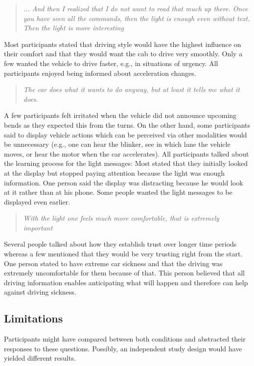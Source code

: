 \begin{quotation}\emph{... And then I realized that I do not want to read that much up there. Once you have seen all the commands, then the light is enough even without text. Then the light is more interesting}\end{quotation}
Most participants stated that driving style would have the highest influence on their comfort and that they would want the cab to drive very smoothly. Only a few wanted the vehicle to drive faster, e.g., in situations of urgency. All participants enjoyed being informed about acceleration changes.
\begin{quotation}\emph{The car does what it wants to do anyway, but at least it tells me what it does.}\end{quotation}
A few participants felt irritated when the vehicle did not announce upcoming bends as they expected this from the turns. On the other hand, some participants said to display vehicle actions which can be perceived via other modalities would be unnecessary (e.g., one can hear the blinker, see in which lane the vehicle moves, or hear the motor when the car accelerates). All participants talked about the learning process for the light messages: Most stated that they initially looked at the display but stopped paying attention because the light was enough information. One person said the display was distracting because he would look at it rather than at his phone. Some people wanted the light messages to be displayed even earlier. \begin{quotation}\emph{
With the light one feels much more comfortable, that is extremely important}\end{quotation}
Several people talked about how they establish trust over longer time periods whereas a few mentioned that they would be very trusting right from the start. One person stated to have extreme car sickness and that the driving was extremely uncomfortable for them because of that. This person believed that all driving information enables anticipating what will happen and therefore can help against driving sickness. 

\subsection{Limitations}
\label{sec:limitations}
Participants might have compared between both conditions and abstracted their responses to these questions. Possibly, an independent study design would have yielded different results.

